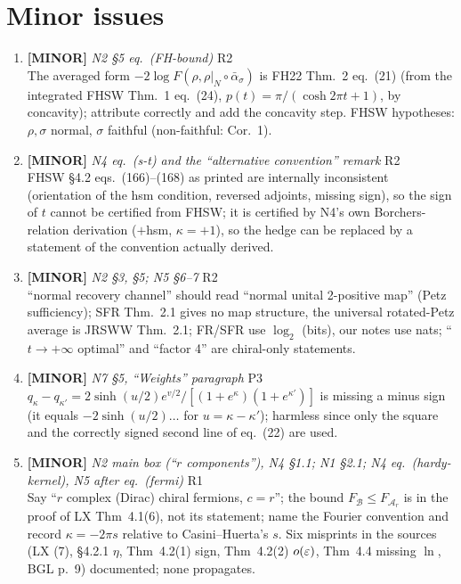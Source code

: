 \documentclass[11pt]{article}
\begin{document}
\begin{enumerate}[leftmargin=1.6em,itemsep=6pt]
\end{enumerate}
\section{Minor issues}
\begin{enumerate}[leftmargin=1.6em,itemsep=6pt]
\item \textbf{[MINOR]} \emph{N2 \S5 eq.\ (FH-bound)} \hfill\textsc{R2}\\ The averaged form \(-2\log F(\rho,\rho|_N\circ\bar\alpha_\sigma)\) is FH22 Thm.~2 eq.~(21) (from the integrated FHSW Thm.~1 eq.~(24), \(p(t)=\pi/(\cosh2\pi t+1)\), by concavity); attribute correctly and add the concavity step. FHSW hypotheses: \(\rho,\sigma\) normal, \(\sigma\) faithful (non-faithful: Cor.~1).
\item \textbf{[MINOR]} \emph{N4 eq.\ (s-t) and the ``alternative convention'' remark} \hfill\textsc{R2}\\ FHSW \S4.2 eqs.\ (166)--(168) as printed are internally inconsistent (orientation of the hsm condition, reversed adjoints, missing sign), so the sign of \(t\) cannot be certified from FHSW; it is certified by N4's own Borchers-relation derivation (\(+\)hsm, \(\kappa=+1\)), so the hedge can be replaced by a statement of the convention actually derived.
\item \textbf{[MINOR]} \emph{N2 \S3, \S5; N5 \S6--7} \hfill\textsc{R2}\\ ``normal recovery channel'' should read ``normal unital 2-positive map'' (Petz sufficiency); SFR Thm.~2.1 gives no map structure, the universal rotated-Petz average is JRSWW Thm.~2.1; FR/SFR use \(\log_2\) (bits), our notes use nats; ``\(t\to+\infty\) optimal'' and ``factor 4'' are chiral-only statements.
\item \textbf{[MINOR]} \emph{N7 \S5, ``Weights'' paragraph} \hfill\textsc{P3}\\ \(q_\kappa-q_{\kappa'}=2\sinh(u/2)e^{v/2}/[(1+e^\kappa)(1+e^{\kappa'})]\) is missing a minus sign (it equals \(-2\sinh(u/2)\dots\) for \(u=\kappa-\kappa'\)); harmless since only the square and the correctly signed second line of eq.~(22) are used.
\item \textbf{[MINOR]} \emph{N2 main box (``\(r\) components''), N4 \S1.1; N1 \S2.1; N4 eq.\ (hardy-kernel), N5 after eq.\ (fermi)} \hfill\textsc{R1}\\ Say ``\(r\) complex (Dirac) chiral fermions, \(c=r\)''; the bound \(F_{\mathcal B}\le F_{\mathcal A_r}\) is in the proof of LX Thm~4.1(6), not its statement; name the Fourier convention and record \(\kappa=-2\pi s\) relative to Casini--Huerta's \(s\). Six misprints in the sources (LX (7), \S4.2.1 \(\eta\), Thm~4.2(1) sign, Thm~4.2(2) \(o(\varepsilon)\), Thm~4.4 missing \(\ln\), BGL p.~9) documented; none propagates.

\end{enumerate}
\end{document}
